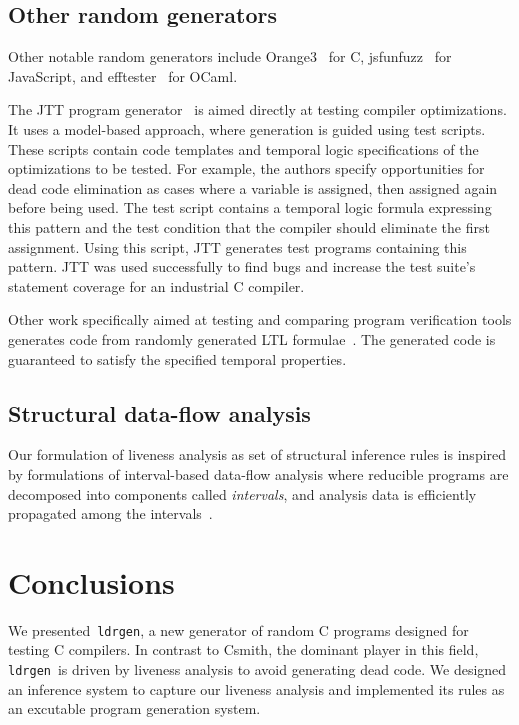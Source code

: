 \documentclass{llncs}
\newcommand\ldrgen{\texttt{ldrgen}}
\begin{document}
\subsection{Other random generators}

Other notable random generators include Orange3~\cite{orange3-2014} for C,
jsfunfuzz~\cite{jsfunfuzz} for JavaScript, and
efftester~\cite{midtgaard.etal-2017} for OCaml.

The JTT program generator~\cite{zhao.etal-2009} is aimed directly at testing
compiler optimizations. It uses a model-based approach, where generation is
guided using test scripts. These scripts contain code templates and temporal
logic specifications of the optimizations to be tested. For example, the
authors specify opportunities for dead code elimination as cases where a
variable is assigned, then assigned again before being used. The test script
contains a temporal logic formula expressing this pattern and the test
condition that the compiler should eliminate the first assignment. Using
this script, JTT generates test programs containing this pattern. JTT was
used successfully to find bugs and increase the test suite's statement
coverage for an industrial C compiler.

Other work specifically aimed at testing and comparing program verification
tools generates code from randomly generated LTL
formulae~\cite{steffen.etal-2014}. The generated code is guaranteed to
satisfy the specified temporal properties.

\subsection{Structural data-flow analysis}

Our formulation of liveness analysis as set of structural inference rules is
inspired by formulations of interval-based data-flow analysis where
reducible programs are decomposed into components called \emph{intervals},
and analysis data is efficiently propagated among the
intervals~\cite{allen-1970,cocke-1970,graham.wegman-1976}.

\section{Conclusions}

We presented~\ldrgen, a new generator of random C programs designed for
testing C compilers. In contrast to Csmith, the dominant player in this
field, \ldrgen\ is driven by liveness analysis to avoid generating dead
code. We designed an inference system to capture our liveness analysis and
implemented its rules as an excutable program generation system.
\end{document}
